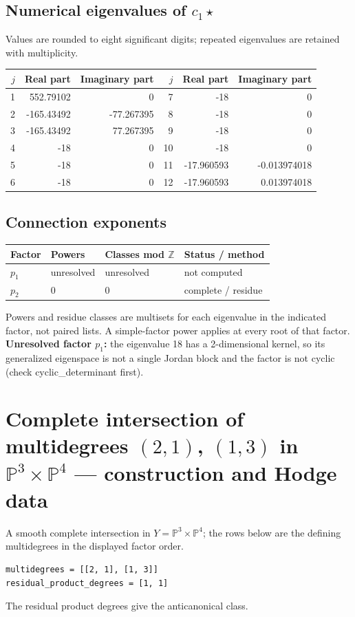 \documentclass[10pt,a4paper]{article}
\begin{document}
\subsection*{Numerical eigenvalues of $c_1\star$}
Values are rounded to eight significant digits; repeated eigenvalues are retained with multiplicity.
\begin{center}\small\begin{tabular}{rrr@{\qquad}rrr}\toprule $j$ & Real part & Imaginary part & $j$ & Real part & Imaginary part\\\midrule
1 & 552.79102 & 0 & 7 & -18 & 0\\
2 & -165.43492 & -77.267395 & 8 & -18 & 0\\
3 & -165.43492 & 77.267395 & 9 & -18 & 0\\
4 & -18 & 0 & 10 & -18 & 0\\
5 & -18 & 0 & 11 & -17.960593 & -0.013974018\\
6 & -18 & 0 & 12 & -17.960593 & 0.013974018\\
\bottomrule\end{tabular}\end{center}
\subsection*{Connection exponents}
\begin{center}\begin{tabular}{llll}\toprule Factor & Powers & Classes mod $\mathbb Z$ & Status / method\\\midrule
$p_{1}$ & unresolved & unresolved & not computed\\
$p_{2}$ & $0$ & $0$ & complete / residue\\
\bottomrule\end{tabular}\end{center}
Powers and residue classes are multisets for each eigenvalue in the indicated factor, not paired lists. A simple-factor power applies at every root of that factor.
\textbf{Unresolved factor $p_{1}$:} the eigenvalue 18 has a 2-dimensional kernel, so its generalized eigenspace is not a single Jordan block and the factor is not cyclic (check cyclic\_determinant first).
\clearpage\section*{Complete intersection of multidegrees $(2,1)$, $(1,3)$ in $\mathbb P^{3}\times \mathbb P^{4}$ --- construction and Hodge data}\label{entry:PROD5-D04}
A smooth complete intersection in $Y=\mathbb P^{3}\times\mathbb P^{4}$; the rows below are the defining multidegrees in the displayed factor order.
\begin{lstlisting}
multidegrees = [[2, 1], [1, 3]]
residual_product_degrees = [1, 1]
\end{lstlisting}
The residual product degrees give the anticanonical class.
\end{document}
